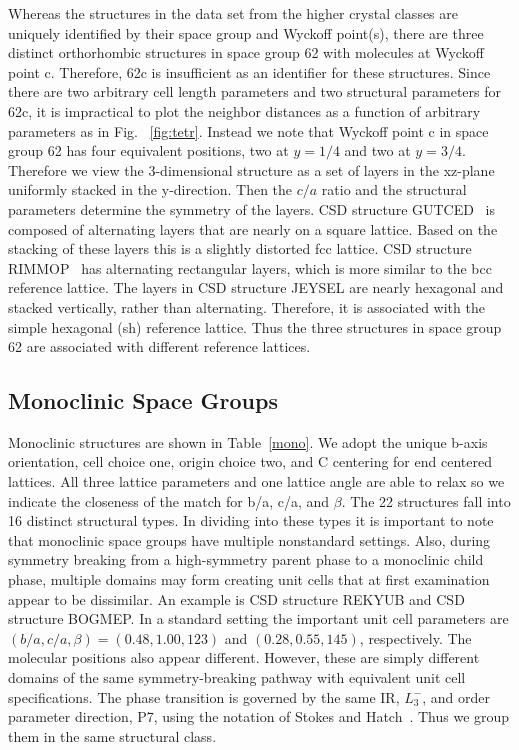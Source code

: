 \documentclass[preprint]{iucr}              %
\begin{document}
Whereas the structures in the data set from the higher crystal
classes are uniquely identified by their space group and Wyckoff
point(s), there are three distinct orthorhombic structures in space
group 62 with molecules at Wyckoff point c.  Therefore, 62c is
insufficient as an identifier for these structures.  Since there are
two arbitrary cell length parameters and two structural parameters
for 62c, it is impractical to plot the neighbor distances as a
function of
arbitrary parameters as in Fig.\ %
\ref{fig:tetr}.  Instead we note that Wyckoff point c in space group
62 has four equivalent positions, two at $y=1/4$ and two at $y=3/4$.
Therefore we view the 3-dimensional structure as a set of layers in
the xz-plane uniformly stacked in the y-direction. Then the $c/a$
ratio and the structural parameters determine the symmetry of the
layers. CSD structure GUTCED~\cite{Dahl03} is composed of
alternating layers that are nearly on a square lattice. Based on the
stacking of these layers this is a slightly distorted fcc lattice.
CSD structure RIMMOP~\cite{Dahl03} has alternating rectangular
layers, which is more similar to the bcc reference lattice. The
layers in CSD structure JEYSEL are nearly hexagonal and stacked
vertically, rather than alternating. Therefore, it is associated
with the simple hexagonal (sh) reference lattice.  Thus the three
structures in space group 62 are associated with different reference
lattices.

\subsection{Monoclinic Space Groups}

Monoclinic structures are shown in Table~\ref{mono}. We adopt the
unique b-axis orientation, cell choice one, origin choice two, and C
centering for end centered lattices. All three lattice parameters
and one lattice angle are able to relax so we indicate the closeness
of the match for b/a, c/a, and $\beta$. The 22 structures fall into
16 distinct structural types. In dividing into these types it is
important to note that monoclinic space groups have multiple
nonstandard settings. Also, during symmetry breaking from a
high-symmetry parent phase to a monoclinic child phase, multiple
domains may form creating unit cells that at first examination
appear to be dissimilar.  An example is CSD structure REKYUB and CSD
structure BOGMEP.  In a standard setting the important unit cell
parameters are $(b/a,c/a,\beta)=(0.48,1.00,123)$ and
$(0.28,0.55,145)$, respectively. The molecular positions also appear
different. However, these are simply different domains of the same
symmetry-breaking pathway with equivalent unit cell specifications.
The phase transition is governed by the same IR, $L_3^-$, and order
parameter direction, P7, using the notation of Stokes and
Hatch~\cite{Stokes02b}. Thus we group them in the same structural
class.
\end{document}
